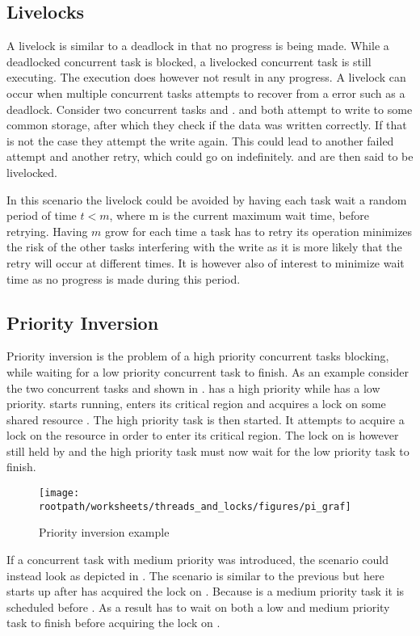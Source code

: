 \subsection{Livelocks} A livelock is similar to a deadlock in that no progress is being made. While a deadlocked concurrent task is blocked, a livelocked concurrent task is still executing. The execution does however not result in any progress. A livelock can occur when multiple concurrent tasks attempts to recover from a error such as a deadlock\cite[p. 457]{tanenbaum2008modern}. Consider two concurrent tasks  and .  and  both attempt to write to some common storage, after which they check if the data was written correctly. If that is not the case they attempt the write again. This could lead to another failed attempt and another retry, which could go on indefinitely.  and  are then said to be livelocked.

In this scenario the livelock could be avoided by having each task wait a random period of time $t < m$, where m is the current maximum wait time, before retrying. Having $m$ grow for each time a task has to retry its operation minimizes the risk of the other tasks interfering with the write as it is more likely that the retry will occur at different times. It is however also of interest to minimize wait time as no progress is made during this period.

\subsection{Priority Inversion}
Priority inversion is the problem of a high priority concurrent tasks blocking, while waiting for a low priority concurrent task to finish\cite[p. 456]{tanenbaum2008modern}. As an example consider the two concurrent tasks  and  shown in .  has a high priority while  has a low priority.  starts running, enters its critical region and acquires a lock on some shared resource . The high priority task  is then started. It attempts to acquire a lock on the resource  in order to enter its critical region. The lock on  is however still held by  and the high priority task  must now wait for the low priority task  to finish.

\begin{figure}[htbp]
\centering
 \texttt{[image: \\rootpath/worksheets/threads\_and\_locks/figures/pi\_graf]} 
 \caption{Priority inversion example}
\label{fig:priority_inversion}
\end{figure}
If a concurrent task  with medium priority was introduced, the scenario could instead look as depicted in . The scenario is similar to the previous but here  starts up after  has acquired the lock on . Because  is a medium priority task it is scheduled before . As a result  has to wait on both a low and medium priority task to finish before acquiring the lock on .


